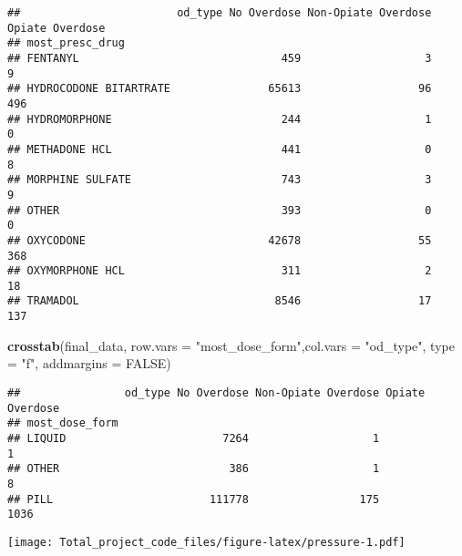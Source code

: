 \documentclass[]{article}
\newenvironment{Shaded}{\begin{snugshade}}{\end{snugshade}}
\newcommand{\KeywordTok}[1]{\textcolor[rgb]{0.13,0.29,0.53}{\textbf{#1}}}
\newcommand{\DataTypeTok}[1]{\textcolor[rgb]{0.13,0.29,0.53}{#1}}
\newcommand{\StringTok}[1]{\textcolor[rgb]{0.31,0.60,0.02}{#1}}
\newcommand{\OtherTok}[1]{\textcolor[rgb]{0.56,0.35,0.01}{#1}}
\newcommand{\NormalTok}[1]{#1}
\begin{document}
\begin{verbatim}
##                        od_type No Overdose Non-Opiate Overdose Opiate Overdose
## most_presc_drug                                                               
## FENTANYL                               459                   3               9
## HYDROCODONE BITARTRATE               65613                  96             496
## HYDROMORPHONE                          244                   1               0
## METHADONE HCL                          441                   0               8
## MORPHINE SULFATE                       743                   3               9
## OTHER                                  393                   0               0
## OXYCODONE                            42678                  55             368
## OXYMORPHONE HCL                        311                   2              18
## TRAMADOL                              8546                  17             137
\end{verbatim}

\begin{Shaded}
\begin{Highlighting}[]
\KeywordTok{crosstab}\NormalTok{(final_data, }\DataTypeTok{row.vars =} \StringTok{"most_dose_form"}\NormalTok{,}\DataTypeTok{col.vars =} \StringTok{"od_type"}\NormalTok{, }\DataTypeTok{type =} \StringTok{"f"}\NormalTok{, }\DataTypeTok{addmargins =} \OtherTok{FALSE}\NormalTok{)}
\end{Highlighting}
\end{Shaded}

\begin{verbatim}
##                od_type No Overdose Non-Opiate Overdose Opiate Overdose
## most_dose_form                                                        
## LIQUID                        7264                   1               1
## OTHER                          386                   1               8
## PILL                        111778                 175            1036
\end{verbatim}

\texttt{[image: Total\_project\_code\_files/figure-latex/pressure-1.pdf]}
\end{document}
